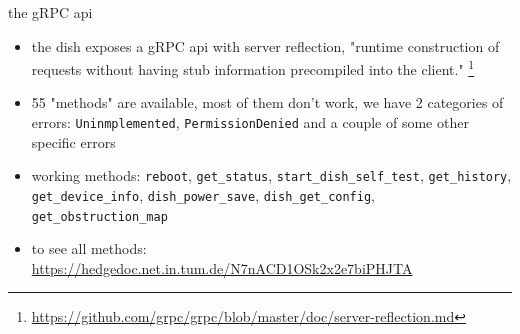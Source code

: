 \documentclass[NET,english,beameralt]{tumbeamer}
\begin{document}
\begin{frame}{the gRPC api}
    \begin{itemize}
        \item the dish exposes a gRPC api with server reflection, "runtime construction of requests without having stub information precompiled into the client." \footnote{\href{https://github.com/grpc/grpc/blob/master/doc/server-reflection.md}{https://github.com/grpc/grpc/blob/master/doc/server-reflection.md}}
        \item 55 "methods" are available, most of them don't work, we have 2 categories of errors: \texttt{Uninmplemented}, \texttt{PermissionDenied} and a couple of some other specific errors 
        \item working methods: \texttt{reboot}, \texttt{get\_status}, \texttt{start\_dish\_self\_test}, \texttt{get\_history}, \texttt{get\_device\_info}, \texttt{dish\_power\_save}, \texttt{dish\_get\_config}, \texttt{get\_obstruction\_map}
        \item to see all methods: \href{https://hedgedoc.net.in.tum.de/N7nACD1OSk2x2e7biPHJTA}{https://hedgedoc.net.in.tum.de/N7nACD1OSk2x2e7biPHJTA}
    \end{itemize}
\end{frame}

%     
%     
\end{document}
